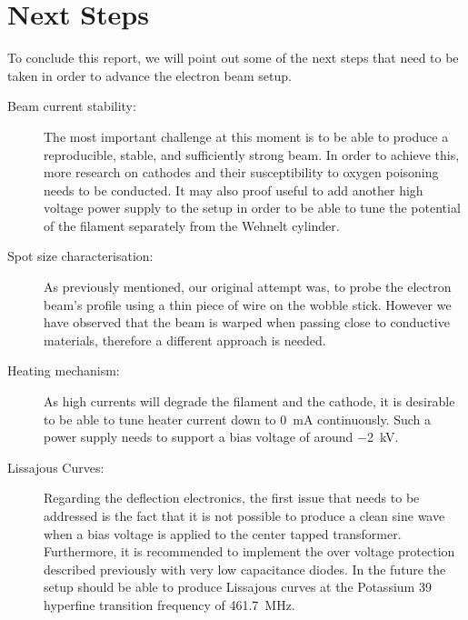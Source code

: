 
\chapter{Next Steps}

To conclude this report, we will point out some of the next steps that need to be taken in order to advance the electron beam setup. 

\begin{description}
	\item[Beam current stability:] The most important challenge at this moment is to be able to produce a reproducible, stable, and sufficiently strong beam. In order to achieve this, more research on cathodes and their susceptibility to oxygen poisoning needs to be conducted. It may also proof useful to add another high voltage power supply to the setup in order to be able to tune the potential of the filament separately from the Wehnelt cylinder. 
	\item[Spot size characterisation:] As previously mentioned, our original attempt was, to probe the electron beam's profile using a thin piece of wire on the wobble stick. However we have observed that the beam is warped when passing close to conductive materials, therefore a different approach is needed. 
	\item[Heating mechanism:] As high currents will degrade the filament and the cathode, it is desirable to be able to tune heater current down to \SI{0}{\milli\ampere} continuously. Such a power supply needs to support a bias voltage of around \SI{-2}{\kilo\volt}. 
	\item[Lissajous Curves:] Regarding the deflection electronics, the first issue that needs to be addressed is the fact that it is not possible to produce a clean sine wave when a bias voltage is applied to  the center tapped transformer. Furthermore, it is recommended to implement the over voltage protection described previously with very low capacitance diodes.  
	In the future the setup should be able to produce Lissajous curves at the Potassium 39 hyperfine transition frequency of \SI{461.7}{\mega\hertz}. 
\end{description}